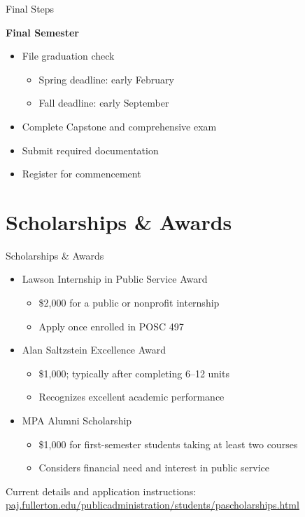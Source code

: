 \documentclass[10pt,aspectratio=169]{beamer}
\begin{document}
\begin{frame}{Final Steps}
\begin{Large}
\textbf{Final Semester}
\begin{itemize}
  \item File graduation check
    \begin{itemize}
      \item Spring deadline: early February
      \item Fall deadline: early September
    \end{itemize}
  \item Complete Capstone and comprehensive exam
  \item Submit required documentation
  \item Register for commencement
\end{itemize}
\end{Large}
\end{frame}

\section{\textcolor{titanorange}{Scholarships \& Awards}}
\begin{frame}{Scholarships \& Awards}
\large
\begin{itemize}
  \item Lawson Internship in Public Service Award
    \begin{itemize}
      \item \$2{,}000 for a public or nonprofit internship
      \item Apply once enrolled in POSC 497
    \end{itemize}
  \item Alan Saltzstein Excellence Award
    \begin{itemize}
      \item \$1{,}000; typically after completing 6--12 units
      \item Recognizes excellent academic performance
    \end{itemize}
  \item MPA Alumni Scholarship
    \begin{itemize}
      \item \$1{,}000 for first-semester students taking at least two courses
      \item Considers financial need and interest in public service
    \end{itemize}
\end{itemize}
\vspace{0.3em}
\footnotesize Current details and application instructions:
\href{https://paj.fullerton.edu/publicadministration/students/pascholarships.html}{paj.fullerton.edu/publicadministration/students/pascholarships.html}
\end{frame}
\end{document}
